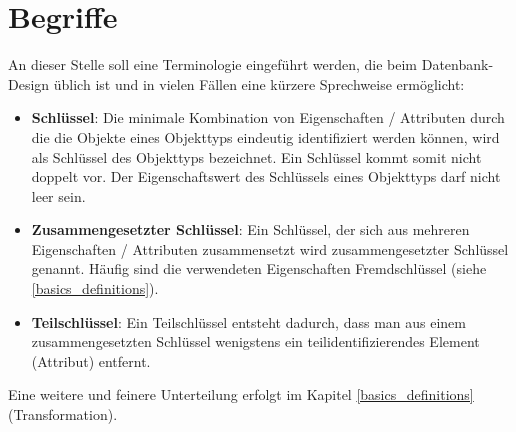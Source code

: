           \begin{center}
          \end{center}

      \section{Begriffe}
        An dieser Stelle soll eine Terminologie eingeführt werden, die beim Datenbank-Design üblich ist und in vielen Fällen eine kürzere Sprechweise ermöglicht:
        \begin{itemize}
          \item \textbf{Schlüssel}: Die minimale Kombination von Eigenschaften / Attributen durch die die Objekte eines Objekttyps eindeutig identifiziert werden können, wird als Schlüs\-sel des Objekttyps bezeichnet. Ein Schlüssel kommt somit nicht doppelt vor. Der Eigenschaftswert des Schlüssels eines Objekttyps darf nicht leer sein.
          \item \textbf{Zusammengesetzter Schlüssel}: Ein Schlüssel, der sich aus mehreren Eigenschaften / Attributen zusammensetzt wird zusammengesetzter Schlüssel genannt. Häufig sind die verwendeten Eigenschaften Fremdschlüssel (siehe \ref{basics_definitions}).
          \item \textbf{Teilschlüssel}: Ein Teilschlüssel entsteht dadurch, dass man aus einem zusammengesetzten Schlüssel wenigstens ein teilidentifizierendes Element (Attribut) entfernt.
        \end{itemize}
        Eine weitere und feinere Unterteilung erfolgt im Kapitel \ref{basics_definitions} (Transformation).
\clearpage
